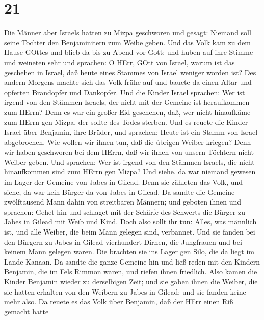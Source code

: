 \hypertarget{section-20}{%
\section{21}\label{section-20}}

 Die Männer aber Israels hatten zu Mizpa geschworen und
gesagt: Niemand soll seine Tochter den Benjaminitern zum Weibe geben.
 Und das Volk kam zu dem Hause GOttes und blieb da bis zu
Abend vor Gott; und huben auf ihre Stimme und weineten sehr 
und sprachen: O HErr, GOtt von Israel, warum ist das geschehen in
Israel, daß heute eines Stammes von Israel weniger worden ist?
 Des andern Morgens machte sich das Volk frühe auf und
bauete da einen Altar und opferten Brandopfer und Dankopfer.
 Und die Kinder Israel sprachen: Wer ist irgend von den
Stämmen Israels, der nicht mit der Gemeine ist heraufkommen zum HErrn?
Denn es war ein großer Eid geschehen, daß, wer nicht hinaufkäme zum
HErrn gen Mizpa, der sollte des Todes sterben.  Und es
reuete die Kinder Israel über Benjamin, ihre Brüder, und sprachen: Heute
ist ein Stamm von Israel abgebrochen.  Wie wollen wir ihnen
tun, daß die übrigen Weiber kriegen? Denn wir haben geschworen bei dem
HErrn, daß wir ihnen von unsern Töchtern nicht Weiber geben.
 Und sprachen: Wer ist irgend von den Stämmen Israels, die
nicht hinaufkommen sind zum HErrn gen Mizpa? Und siehe, da war niemand
gewesen im Lager der Gemeine von Jabes in Gilead.  Denn sie
zähleten das Volk, und siehe, da war kein Bürger da von Jabes in Gilead.
 Da sandte die Gemeine zwölftausend Mann dahin von
streitbaren Männern; und geboten ihnen und sprachen: Gehet hin und
schlaget mit der Schärfe des Schwerts die Bürger zu Jabes in Gilead mit
Weib und Kind.  Doch also sollt ihr tun: Alles, was
männlich ist, und alle Weiber, die beim Mann gelegen sind, verbannet.
 Und sie fanden bei den Bürgern zu Jabes in Gilead
vierhundert Dirnen, die Jungfrauen und bei keinem Mann gelegen waren.
Die brachten sie ins Lager gen Silo, die da liegt im Lande Kanaan.
 Da sandte die ganze Gemeine hin und ließ reden mit den
Kindern Benjamin, die im Fels Rimmon waren, und riefen ihnen friedlich.
 Also kamen die Kinder Benjamin wieder zu derselbigen Zeit;
und sie gaben ihnen die Weiber, die sie hatten erhalten von den Weibern
zu Jabes in Gilead; und sie fanden keine mehr also.  Da
reuete es das Volk über Benjamin, daß der HErr einen Riß gemacht hatte
